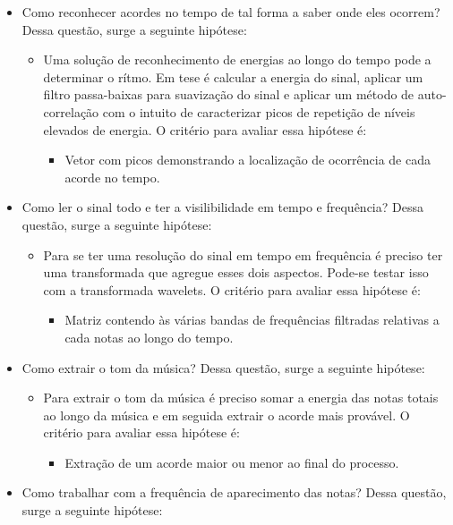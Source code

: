 \begin{itemize}
	\item Como reconhecer acordes no tempo de tal forma a saber onde eles ocorrem? Dessa questão, surge a seguinte hipótese:
	\begin{itemize}
		\item Uma solução de reconhecimento de energias ao longo do tempo pode a determinar o rítmo. Em tese é calcular a energia do sinal, aplicar
um filtro passa-baixas para suavização do sinal e aplicar um método de auto-correlação com o intuito de caracterizar picos de repetição de níveis elevados de energia.
		O critério para avaliar essa hipótese é:
			\begin{itemize}
				\item Vetor com picos demonstrando a localização de ocorrência de cada acorde no tempo.		
			\end{itemize}
	\end{itemize}
	\item Como ler o sinal todo e ter a visilibilidade em tempo e frequência? Dessa questão, surge a seguinte hipótese:
	\begin{itemize}
		\item Para se ter uma resolução do sinal em tempo em frequência é
preciso ter uma transformada que agregue esses dois aspectos. Pode-se testar isso
com a transformada wavelets.
		O critério para avaliar essa hipótese é:
			\begin{itemize}
				\item Matriz contendo às várias bandas de frequências filtradas relativas a cada notas ao longo do tempo.
			\end{itemize}
	\end{itemize}
	\item Como extrair o tom da música? Dessa questão, surge a seguinte hipótese:
	\begin{itemize}
		\item Para extrair o tom da música é preciso somar a energia das notas totais
ao longo da música e em seguida extrair o acorde mais provável.
		O critério para avaliar essa hipótese é:
			\begin{itemize}
				\item Extração de um acorde maior ou menor ao final do processo.		
			\end{itemize}
	\end{itemize}
	\item Como trabalhar com a frequência de aparecimento das notas? Dessa questão, surge a seguinte hipótese:
	\begin{itemize}

\end{itemize}
\end{itemize}
